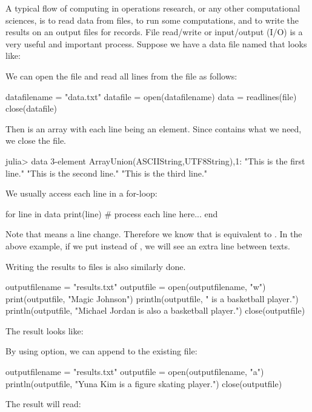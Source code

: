 A typical flow of computing in operations research, or any other computational sciences, is to read data from files, to run some computations, and to write the results on an output files for records. File read/write or input/output (I/O) is a very useful and important process.
Suppose we have a data file named  that looks like:
\begin{codelisting}
\end{codelisting}
We can open the file and read all lines from the file as follows:
\begin{code}
datafilename = "data.txt"
datafile = open(datafilename)
data = readlines(file)
close(datafile)
\end{code}
\noindent Then  is an array with each line being an element. Since  contains what we need, we close the file.
\begin{code}
julia> data
3-element Array{Union(ASCIIString,UTF8String),1}:
 "This is the first line.\n"
 "This is the second line.\n"
 "This is the third line."
\end{code}
\noindent We usually access each line in a for-loop:
\begin{code}
for line in data
	print(line)
	# process each line here...
end
\end{code}
\noindent Note that  means a line change. Therefore we know that  is equivalent to . In the above example, if we put  instead of , we will see an extra line between texts.




Writing the results to files is also similarly done.
\begin{code}
outputfilename = "results.txt"
outputfile = open(outputfilename, "w")
print(outputfile, "Magic Johnson")
println(outputfile, " is a basketball player.")
println(outputfile, "Michael Jordan is also a basketball player.")
close(outputfile)
\end{code}
\noindent The result looks like:
\begin{codelisting}
\end{codelisting}

By using  option, we can append to the existing file:
\begin{code}
outputfilename = "results.txt"
outputfile = open(outputfilename, "a")
println(outputfile, "Yuna Kim is a figure skating player.")
close(outputfile)
\end{code}
The result will read:
\begin{codelisting}
\end{codelisting}



